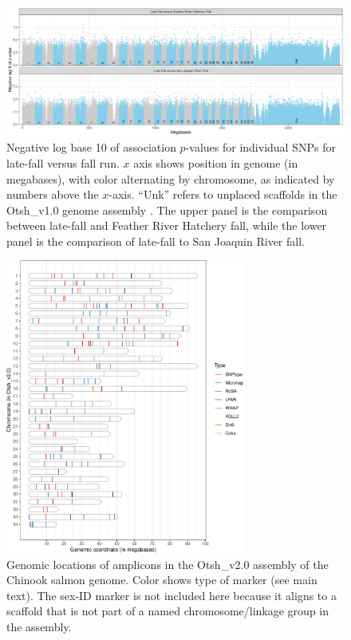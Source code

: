 
\begin{figure}
\includegraphics[width=\textwidth]{images/lfar-assoc-faceted.jpg}
\caption[
	Negative log base 10 of association $p$-values for
	individual SNPs for late-fall versus fall run
]{
	\footnotesize Negative log base 10 of association $p$-values for
	individual SNPs for late-fall versus fall run.  $x$ axis shows position in genome (in megabases),
	with color alternating by chromosome, as indicated by numbers above the $x$-axis. ``Unk'' refers
	to unplaced scaffolds in the Otsh\_v1.0 genome assembly \citep{christensen2018chinook}. The 
	upper panel is the comparison between late-fall and Feather River Hatchery fall, while the lower 
	panel is the comparison of late-fall to San Joaquin River fall. 
}
\label{fig:lfar-assoc}
\end{figure}



\begin{figure}
\begin{center}
\includegraphics[width=0.7\textwidth]{images/genomic-locations-plot.pdf}
\end{center}
\caption[Genomic locations of amplicons]{\footnotesize Genomic locations of amplicons in the
Otsh\_v2.0 assembly of the Chinook salmon genome.  Color shows type of marker (see main text).
The sex-ID marker is not included here because it aligns to a scaffold that is not part of a
named chromosome/linkage group in the assembly.}
\label{fig:num-alle}
\end{figure}






